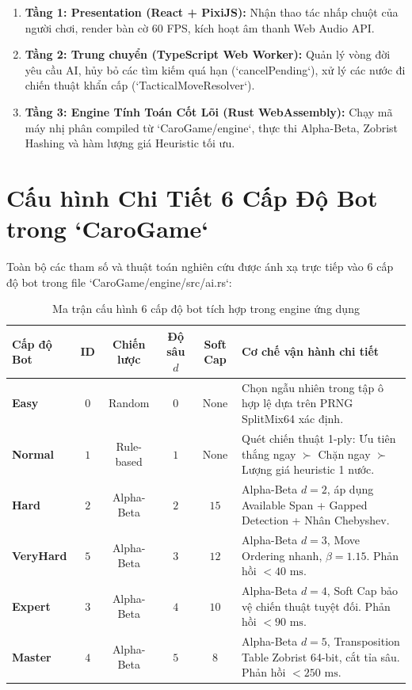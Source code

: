\documentclass[11pt,a4paper]{report}
\begin{document}
\begin{enumerate}
    \item \textbf{Tầng 1: Presentation (React + PixiJS):} Nhận thao tác nhấp chuột của người chơi, render bàn cờ 60 FPS, kích hoạt âm thanh Web Audio API.
    \item \textbf{Tầng 2: Trung chuyển (TypeScript Web Worker):} Quản lý vòng đời yêu cầu AI, hủy bỏ các tìm kiếm quá hạn (`cancelPending`), xử lý các nước đi chiến thuật khẩn cấp (`TacticalMoveResolver`).
    \item \textbf{Tầng 3: Engine Tính Toán Cốt Lõi (Rust WebAssembly):} Chạy mã máy nhị phân compiled từ `CaroGame/engine`, thực thi Alpha-Beta, Zobrist Hashing và hàm lượng giá Heuristic tối ưu.
\end{enumerate}

\section{Cấu hình Chi Tiết 6 Cấp Độ Bot trong `CaroGame`}

Toàn bộ các tham số và thuật toán nghiên cứu được ánh xạ trực tiếp vào 6 cấp độ bot trong file `CaroGame/engine/src/ai.rs`:

\begin{table}[htbp]
\centering
\small
\begin{tabularx}{\textwidth}{l c c c c X}
\toprule
\textbf{Cấp độ Bot} & \textbf{ID} & \textbf{Chiến lược} & \textbf{Độ sâu $d$} & \textbf{Soft Cap} & \textbf{Cơ chế vận hành chi tiết} \\
\midrule
\textbf{Easy} & $0$ & Random & $0$ & None & Chọn ngẫu nhiên trong tập ô hợp lệ dựa trên PRNG SplitMix64 xác định. \\
\textbf{Normal} & $1$ & Rule-based & $1$ & None & Quét chiến thuật 1-ply: Ưu tiên thắng ngay $\succ$ Chặn ngay $\succ$ Lượng giá heuristic 1 nước. \\
\textbf{Hard} & $2$ & Alpha-Beta & $2$ & $15$ & Alpha-Beta $d=2$, áp dụng Available Span + Gapped Detection + Nhân Chebyshev. \\
\textbf{VeryHard} & $5$ & Alpha-Beta & $3$ & $12$ & Alpha-Beta $d=3$, Move Ordering nhanh, $\beta = 1.15$. Phản hồi $< 40\text{ ms}$. \\
\textbf{Expert} & $3$ & Alpha-Beta & $4$ & $10$ & Alpha-Beta $d=4$, Soft Cap bảo vệ chiến thuật tuyệt đối. Phản hồi $< 90\text{ ms}$. \\
\textbf{Master} & $4$ & Alpha-Beta & $5$ & $8$ & Alpha-Beta $d=5$, Transposition Table Zobrist 64-bit, cắt tỉa sâu. Phản hồi $< 250\text{ ms}$. \\
\bottomrule
\end{tabularx}
\caption{Ma trận cấu hình 6 cấp độ bot tích hợp trong engine ứng dụng}
\end{table}
\end{document}
